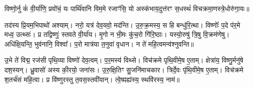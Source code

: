 


विष्णो॒र्नु कं॑ वी॒र्या॑णि॒ प्रवो॑चं॒ यः पार्थि॑वानि विम॒मे रजाꣳ॑सि॒ यो अस्क॑भाय॒दुत्त॑रꣳ स॒धस्थं॑ विचक्रमा॒णस्त्रे॒धोरु॑गा॒यः॥ 

तद॑स्य प्रि॒यम॒भिपाथो॑ अश्याम्। नरो॒ यत्र॑ देव॒यवो॒ मद॑न्ति। उ॒रु॒क्र॒मस्य॒ स हि बन्धु॑रि॒त्था। विष्णोः᳚ प॒दे प॑र॒मे मध्व॒ उत्थ्सः॑। प्र तद्विष्णुः॑  स्तवते वी॒र्या॑य। मृ॒गो न भी॒मः कु॑च॒रो गि॑रि॒ष्ठाः। यस्यो॒रुषु॑ त्रि॒षु वि॒क्रम॑णेषु। अधि॑क्षि॒यन्ति॒ भुव॑नानि॒ विश्वा᳚। प॒रो मात्र॑या त॒नुवा॑ वृधान। न ते॑ महि॒त्वमन्व॑श्नुवन्ति॥ 

उ॒भे ते॑ विद्म॒ रज॑सी पृथि॒व्या विष्णो॑ देव॒त्वम्। प॒र॒मस्य॑ विथ्से। विच॑क्रमे पृथि॒वीमे॒ष ए॒ताम्। क्षेत्रा॑य॒ विष्णु॒र्मनु॑षे दश॒स्यन्। ध्रु॒वासो॑ अस्य की॒रयो॒ जना॑सः। उ॒रु॒क्षि॒तिꣳ सु॒जनि॑माचकार। त्रिर्दे॒वः पृ॑थि॒वीमे॒ष ए॒ताम्। विच॑क्रमे श॒तर्च॑सं महि॒त्वा। प्र वि॑ष्णुरस्तु त॒वस॒स्तवी॑यान्। त्वे॒षꣴह्य॑स्य॒ स्थवि॑रस्य॒ नाम॑॥ 

